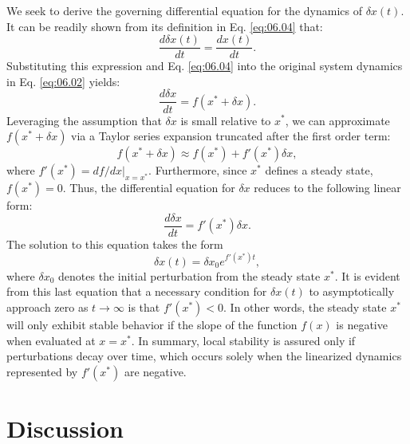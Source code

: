 We seek to derive the governing differential equation for the dynamics of $\delta x(t)$. It can be readily shown from its definition in Eq. \eqref{eq:06.04} that:
\begin{equation*}
\frac{d\delta x(t)}{dt} = \frac{dx(t)}{dt}.
\end{equation*}
Substituting this expression and Eq. \eqref{eq:06.04} into the original system dynamics in Eq. \eqref{eq:06.02} yields:
\begin{equation*}
\frac{d\delta x}{dt} = f(x^* + \delta x).
\end{equation*}
Leveraging the assumption that $\delta x$ is small relative to $x^*$, we can approximate $f(x^* + \delta x)$ via a Taylor series expansion truncated after the first order term:
\begin{equation*}
f(x^* + \delta x) \approx f(x^*) + f'(x^*)\delta x,
\end{equation*}
where $f'(x^*)=d f/d x|_{x=x^*}$. Furthermore, since $x^*$ defines a steady state, $f(x^*)=0$. Thus, the differential equation for $\delta x$ reduces to the following linear form:
\begin{equation*}
\frac{d\delta x}{dt} = f'(x^*)\delta x.
\end{equation*}
The solution to this equation takes the form
\begin{equation*}
    \delta x(t) = \delta x_0 e^{f'(x^*) t},
\end{equation*}
where $\delta x_0$ denotes the initial perturbation from the steady state $x^*$. It is evident from this last equation that a necessary condition for $\delta x(t)$ to asymptotically approach zero as $t\to\infty$ is that $f'(x^*)<0$. In other words, the steady state $x^*$ will only exhibit stable behavior if the slope of the function $f(x)$ is negative when evaluated at $x=x^*$. In summary, local stability is assured only if perturbations decay over time, which occurs solely when the linearized dynamics represented by $f'(x^*)$ are negative. 

\section{Discussion}

